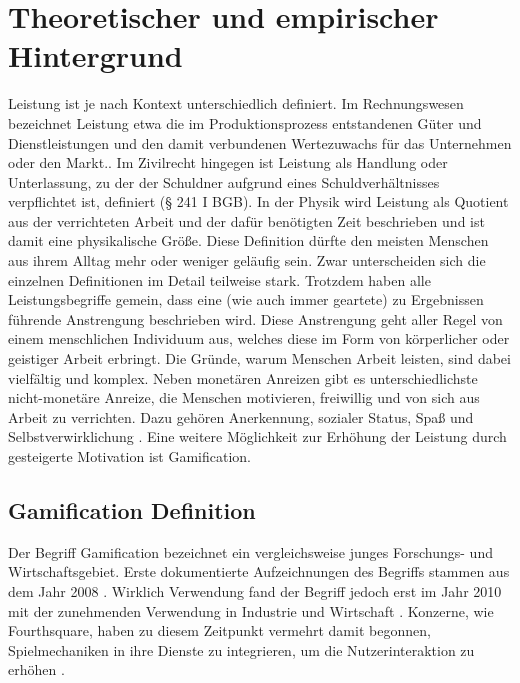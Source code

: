 \section{Theoretischer und empirischer Hintergrund}
Leistung ist je nach Kontext unterschiedlich definiert. Im Rechnungswesen bezeichnet Leistung etwa die im Produktionsprozess entstandenen Güter und Dienstleistungen und den damit verbundenen Wertezuwachs für das Unternehmen oder den Markt.\cite{woeltje2010abc}. Im Zivilrecht hingegen ist Leistung als Handlung oder Unterlassung, zu der der Schuldner aufgrund eines Schuldverhältnisses verpflichtet ist, definiert (§ 241 I BGB). In der Physik wird Leistung als Quotient aus der verrichteten Arbeit und der dafür benötigten Zeit beschrieben und ist damit eine physikalische Größe. Diese Definition dürfte den meisten Menschen aus ihrem Alltag mehr oder weniger geläufig sein. Zwar unterscheiden sich die einzelnen Definitionen im Detail teilweise stark. Trotzdem haben alle Leistungsbegriffe gemein, dass eine (wie auch immer geartete) zu Ergebnissen führende Anstrengung beschrieben wird. Diese Anstrengung geht aller Regel von einem menschlichen Individuum aus, welches diese im Form von körperlicher oder geistiger Arbeit erbringt. Die Gründe, warum Menschen Arbeit leisten, sind dabei vielfältig und komplex. Neben monetären Anreizen gibt es unterschiedlichste nicht-monetäre Anreize, die Menschen motivieren, freiwillig und von sich aus Arbeit zu verrichten. Dazu gehören Anerkennung, sozialer Status, Spaß und Selbstverwirklichung \cite{shujaat}. Eine weitere Möglichkeit zur Erhöhung der Leistung durch gesteigerte Motivation ist Gamification. 

\subsection{Gamification Definition}
Der Begriff Gamification bezeichnet ein vergleichsweise junges Forschungs- und Wirtschaftsgebiet. Erste dokumentierte Aufzeichnungen des Begriffs stammen aus dem Jahr 2008 \cite{huotari_defining_2012, deterding_game_2011}. Wirklich Verwendung fand der Begriff jedoch erst im Jahr 2010 mit der zunehmenden Verwendung in Industrie und Wirtschaft \cite{huotari_defining_2012}. Konzerne, wie Fourthsquare, haben zu diesem Zeitpunkt vermehrt damit begonnen, Spielmechaniken in ihre Dienste zu integrieren, um die Nutzerinteraktion zu erhöhen \cite{deterding_game_2011}.

